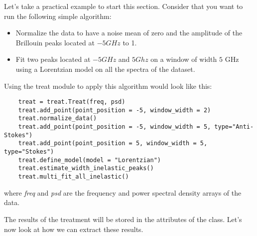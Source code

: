 Let's take a practical example to start this section. Consider that you want to run the following simple algorithm:
\begin{itemize}
    \item Normalize the data to have a noise mean of zero and the amplitude of the Brillouin peaks located at $-5 GHz$ to 1.
    \item Fit two peaks located at $-5 GHz$ and $5 Ghz$ on a window of width $5$ GHz using a Lorentzian model on all the spectra of the dataset.
\end{itemize}

Using the treat module to apply this algorithm would look like this:
\begin{lstlisting}
    treat = treat.Treat(freq, psd)
    treat.add_point(point_position = -5, window_width = 2)
    treat.normalize_data()
    treat.add_point(point_position = -5, window_width = 5, type="Anti-Stokes")
    treat.add_point(point_position = 5, window_width = 5, type="Stokes")
    treat.define_model(model = "Lorentzian")
    treat.estimate_width_inelastic_peaks()
    treat.multi_fit_all_inelastic()
\end{lstlisting}

where \textit{freq} and \textit{psd} are the frequency and power spectral density arrays of the data. 

The results of the treatment will be stored in the attributes of the class. Let's now look at how we can extract these results.








